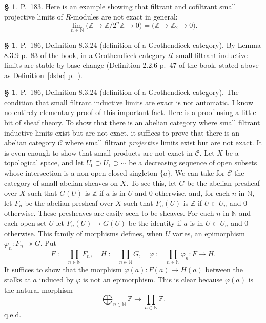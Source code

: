 \documentclass[12pt]{article}
\theoremstyle{remark}
\theoremstyle{definition}
\newtheorem{s}[thm]{\S}
\newcommand{\bb}{\mathbb}
\newcommand{\C}{\mathcal C}
\newcommand{\U}{\mathcal U}
\newcommand{\pp}{\varphi}
\newcommand{\epi}{\twoheadrightarrow}
\begin{document}
%

\begin{s} 
P.~183. Here is an example showing that filtrant and cofiltrant small projective limits of $R$-modules are not exact in general: 
$$
\lim_{n\in\bb N}\big(\bb Z\to\bb Z/2^n\bb Z\to0\big)=\big(\bb Z\to\bb Z_2\to0\big).
$$
\end{s}

%

\begin{s}\label{gcsbc}
P.~186, Definition 8.3.24 (definition of a Grothendieck category). By Lemma 8.3.9 p.~83 of the book, in a Grothendieck category $\U$-small filtrant inductive limits are stable by base change (Definition 2.2.6 p.~47 of the book, stated above as Definition~\ref{dsbc} p.~\pageref{dsbc}).
\end{s}

%

\begin{s} 
P.~186, Definition 8.3.24 (definition of a Grothendieck category). The condition that small filtrant inductive limits are exact is not automatic. I know no entirely elementary proof of this important fact. Here is a proof using a little bit of sheaf theory. To show that there is an abelian category where small filtrant inductive limits exist but are not exact, it suffices to prove that there is an abelian category $\C$ where small filtrant {\em projective} limits exist but are not exact. It is even enough to show that small products are not exact in $\C$. Let $X$ be a topological space, and let $U_0\supset U_1\supset\cdots$ be a decreasing sequence of open subsets whose intersection is a non-open closed singleton $\{a\}$. We can take for $\C$ the category of small abelian sheaves on $X$. To see this, let $G$ be the abelian presheaf over $X$ such that $G(U)$ is $\mathbb Z$ if $a$ is in $U$ and 0 otherwise, and, for each $n$ in $\mathbb N$, let $F_n$ be the abelian presheaf over $X$ such that $F_n(U)$ is $\mathbb Z$ if $U\subset U_n$ and 0 otherwise. These presheaves are easily seen to be sheaves. For each $n$ in $\mathbb N$ and each open set $U$ let $F_n(U)\to G(U)$ be the identity if $a$ is in $U\subset U_n$ and 0 otherwise. This family of morphisms defines, when $U$ varies, an epimorphism $\pp_n:F_n\epi G$. Put 
$$
F:=\prod_{n\in\mathbb N}F_n,\quad H:=\prod_{n\in\mathbb N}G,\quad\pp:=\prod_{n\in\mathbb N}\pp_n:F\to H.
$$ 
It suffices to show that the morphism $\pp(a):F(a)\to H(a)$ between the stalks at $a$ induced by $\pp$ is not an epimorphism. This is clear because $\pp(a)$ is the natural morphism 
$$
\bigoplus_{n\in\mathbb N}\mathbb Z\to\prod_{n\in\mathbb N}\mathbb Z.
$$
q.e.d.
\end{s}
\end{document}
